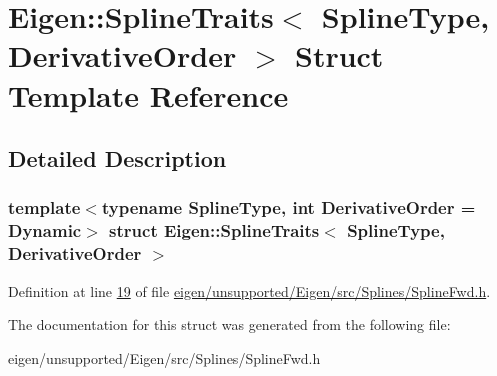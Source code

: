 \hypertarget{struct_eigen_1_1_spline_traits}{}\section{Eigen\+:\+:Spline\+Traits$<$ Spline\+Type, Derivative\+Order $>$ Struct Template Reference}
\label{struct_eigen_1_1_spline_traits}


\subsection{Detailed Description}
\subsubsection*{template$<$typename Spline\+Type, int Derivative\+Order = Dynamic$>$\newline
struct Eigen\+::\+Spline\+Traits$<$ Spline\+Type, Derivative\+Order $>$}



Definition at line \hyperlink{eigen_2unsupported_2_eigen_2src_2_splines_2_spline_fwd_8h_source_l00019}{19} of file \hyperlink{eigen_2unsupported_2_eigen_2src_2_splines_2_spline_fwd_8h_source}{eigen/unsupported/\+Eigen/src/\+Splines/\+Spline\+Fwd.\+h}.



The documentation for this struct was generated from the following file\+:\begin{DoxyCompactItemize}
\item 
eigen/unsupported/\+Eigen/src/\+Splines/\+Spline\+Fwd.\+h\end{DoxyCompactItemize}
